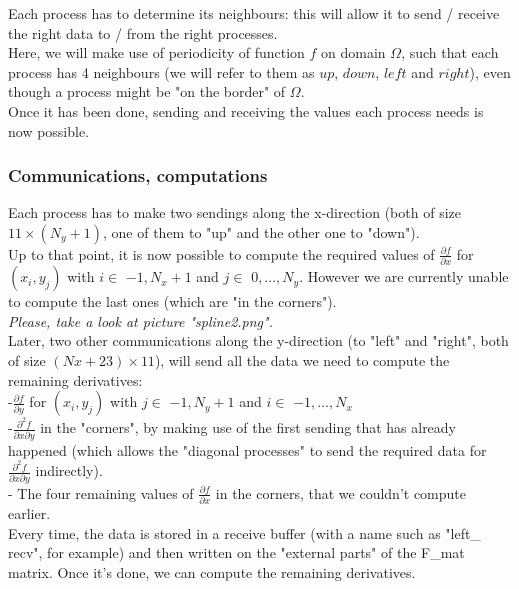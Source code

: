\documentclass[10pt]{article}
\begin{document}
Each process has to determine its neighbours: this will allow it to send / receive the right data to / from the right processes.\\

Here, we will make use of periodicity of function $f$ on domain $\Omega$, such that each process has 4 neighbours (we will refer to them as $up$, $down$, $left$ and $right$), even though a process might be "on the border" of $\Omega$.\\
Once it has been done, sending and receiving the values each process needs is now possible.\\


\subsubsection{Communications, computations }


Each process has to make two sendings along the x-direction (both of size $11 \times (N_y+1)$, one of them to "up" and the other
 one to "down").\\ Up to that point, it is now possible to compute the required values of $\frac{\partial f}{\partial x}$ for $(x_i,y_j)$ with $ i \in${ $-1, N_x+1$} and $j \in$ {$0,...,N_y$}. However we are currently unable to compute the last ones (which are "in the corners").\\
 
\textit{Please, take a look at picture "\textit{spline2.png}".}\\
 
Later, two other communications along the y-direction (to "left" and "right", both of size $(Nx +23) \times 11$), will send all the data we need to compute the remaining derivatives:\\

-$\frac{\partial f}{\partial y}$ for $(x_i,y_j)$ with $ j \in${ $-1, N_y+1$} and $i \in$ {$-1,...,N_x$}\\

-$\frac{\partial ^2 f}{\partial x \partial y}$ in the "corners", by making use of the first sending that has already happened (which allows the "diagonal processes" to send the required data for $\frac{\partial ^2 f}{\partial x \partial y}$ indirectly).\\

- The four remaining values of $\frac{\partial f}{\partial x}$ in the corners, that we couldn't compute earlier.\\


Every time, the data is stored in a receive buffer (with a name such as "left\_ recv", for example) and then written on the "external parts" of the F\_mat matrix. Once it's done, we can compute the remaining derivatives.\\
\end{document}
